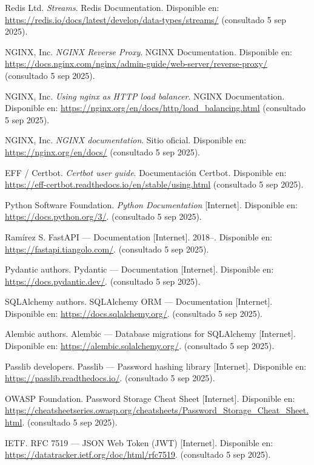 \documentclass[12pt, a4paper]{article}
\begin{document}
\begin{thebibliography}{9}
Redis Ltd.
\textit{Streams}. Redis Documentation.
Disponible en: \url{https://redis.io/docs/latest/develop/data-types/streams/} (consultado 5 sep 2025).

NGINX, Inc.
\textit{NGINX Reverse Proxy}. NGINX Documentation.
Disponible en: \url{https://docs.nginx.com/nginx/admin-guide/web-server/reverse-proxy/} (consultado 5 sep 2025).

NGINX, Inc.
\textit{Using nginx as HTTP load balancer}. NGINX Documentation.
Disponible en: \url{https://nginx.org/en/docs/http/load_balancing.html} (consultado 5 sep 2025).

NGINX, Inc.
\textit{NGINX documentation}. Sitio oficial.
Disponible en: \url{https://nginx.org/en/docs/} (consultado 5 sep 2025).

EFF / Certbot.
\textit{Certbot user guide}. Documentación Certbot.
Disponible en: \url{https://eff-certbot.readthedocs.io/en/stable/using.html} (consultado 5 sep 2025).

Python Software Foundation. 
\textit{Python Documentation} [Internet]. 
Disponible en: \url{https://docs.python.org/3/}. (consultado 5 sep 2025).

Ramírez S. FastAPI — Documentation [Internet]. 2018–. 
Disponible en: \url{https://fastapi.tiangolo.com/}. (consultado 5 sep 2025).

Pydantic authors. Pydantic — Documentation [Internet]. 
Disponible en: \url{https://docs.pydantic.dev/}. (consultado 5 sep 2025).

SQLAlchemy authors. SQLAlchemy ORM — Documentation [Internet]. 
Disponible en: \url{https://docs.sqlalchemy.org/}. (consultado 5 sep 2025).

Alembic authors. Alembic — Database migrations for SQLAlchemy [Internet]. 
Disponible en: \url{https://alembic.sqlalchemy.org/}. (consultado 5 sep 2025).

Passlib developers. Passlib — Password hashing library [Internet]. 
Disponible en: \url{https://passlib.readthedocs.io/}. (consultado 5 sep 2025).
 
OWASP Foundation. Password Storage Cheat Sheet [Internet]. 
Disponible en: \url{https://cheatsheetseries.owasp.org/cheatsheets/Password_Storage_Cheat_Sheet.html}. (consultado 5 sep 2025).

IETF. RFC 7519 — JSON Web Token (JWT) [Internet]. 
Disponible en: \url{https://datatracker.ietf.org/doc/html/rfc7519}. (consultado 5 sep 2025).


\end{thebibliography}
\end{document}
